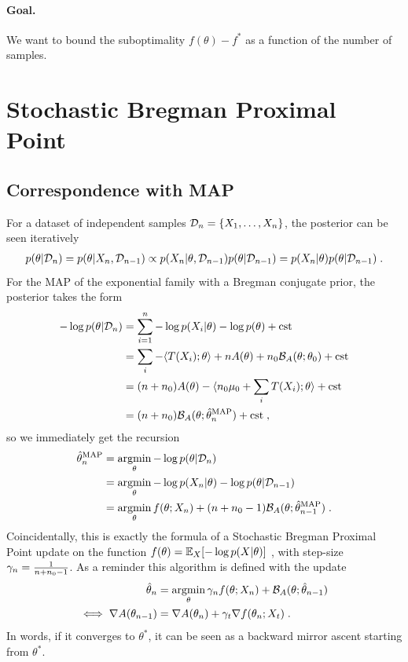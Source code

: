 \documentclass{article}
\newcommand{\logpart}{A}
\newcommand{\bregman}{\cB_\logpart}
\newcommand{\nat}{\theta}
\newcommand{\lr}{\gamma} %
\begin{document}
\paragraph{Goal.} We want to bound the suboptimality $f(\nat) - f^*$ as a function of the number of samples. 

\section{Stochastic Bregman Proximal Point}
\subsection{Correspondence with MAP}
For a dataset of independent samples ${\mathcal D}_n = \{X_1,\dots,X_n\}$, the posterior can be seen iteratively
\begin{align}
	p(\nat |\cD_n)
	=p(\nat|X_n,\cD_{n-1})
	\propto p(X_n|\nat,\cD_{n-1}) p(\nat|\cD_{n-1})
	=p(X_n|\nat)p(\nat |\cD_{n-1}) \; .
\end{align}
For the MAP of the exponential family with a Bregman conjugate prior, the posterior takes the form
\begin{align}
	- \log p(\nat | \cD_n) 
	&= \sum_{i=1}^n -\log p(X_i | \nat) - \log p(\nat) + \cst\\
	&= \sum_i - \langle T(X_i) ; \nat \rangle  + n \logpart(\nat) + n_0 \bregman(\nat ; \nat_0) +\cst \\
	&= (n+n_0)\logpart(\nat)  - \langle n_0 \mu_0 + \sum_i T(X_i) ; \nat \rangle + \cst \\
	&= (n+n_0) \bregman(\nat; \hat \nat_n^\text{MAP}) + \cst \; ,
\end{align}
so we immediately get the recursion
\begin{align}
    \hat \nat_n^\text{MAP}
    &= \argmin_\nat - \log p(\nat | \cD_n) \\
    &= \argmin_\nat - \log p(X_n|\nat) - \log p(\nat | \cD_{n-1}) \\
    &= \argmin_\nat f(\nat; X_{n}) + (n+n_0 - 1) \bregman(\nat; \hat \nat_{n-1}^\text{MAP})  \; .
    \label{eq:SBPP}
\end{align} 
Coincidentally, this is exactly the formula of a Stochastic Bregman Proximal Point update on the function $f(\nat) = \E_X[-\log p(X|\nat)]$ , with step-size $\lr_n = \inv{n+n_0 -1}$. As a reminder this algorithm is defined with the update
\begin{align}
	 \hat \nat_n
    &= \argmin_\nat \lr_n f(\nat; X_{n}) + \bregman(\nat; \hat \nat_{n-1}) \\
    \iff \nabla \logpart(\nat_{n-1}) &= \nabla\logpart(\nat_n) + \lr_t \nabla f(\nat_n ; X_t) \; .
\end{align}
In words, if it converges to $\nat^*$, it can be seen as a backward mirror ascent starting from $\nat^*$.
\end{document}
